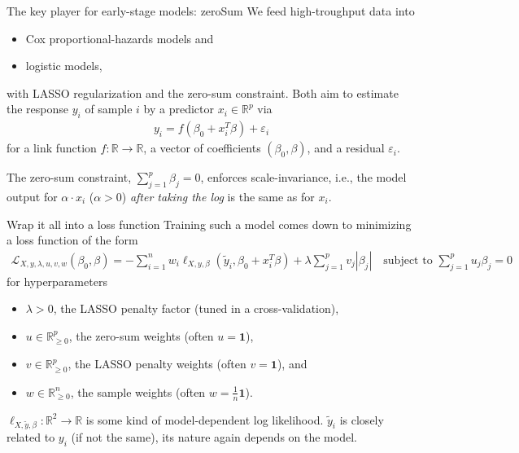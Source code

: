 \documentclass[10pt, aspectratio=169]{beamer}
\def\RR{\mathbb{R}}
\begin{document}
\begin{frame}{The key player for early-stage models: zeroSum}
  We feed high-troughput data into 

  \begin{itemize}
    \item \alert{Cox} proportional-hazards models and
    \item \alert{logistic} models,
  \end{itemize}

  with \alert{LASSO} regularization and the \alert{zero-sum} constraint. Both  
  aim to estimate the response $y_i$ of sample $i$ by a predictor $x_i \in \mathbb{R}^p$ via 
  \begin{align}
    y_i = f(\beta_0 + x_i^T \beta) + \varepsilon_i
  \end{align}
  for a link function $f: \mathbb{R} \to \mathbb{R}$, a vector of coefficients $(\beta_0, 
  \beta)$, and a residual $\varepsilon_i$.

  \pause
  The zero-sum constraint, $\sum_{j=1}^p \beta_j = 0$, enforces \alert{scale-invariance}, i.e., 
  the model output for $\alpha \cdot x_i$ ($\alpha > 0$) \textit{after taking the log} is the same 
  as for $x_i$.
\end{frame}

\begin{frame}{Wrap it all into a loss function}
  Training such a model comes down to minimizing a loss function of the form 
  \begin{align}
    \mathcal{L}_{X, y, \lambda, u, v, w}(\beta_0, \beta) = -\sum_{i=1}^n w_i 
    \ell_{X, y, \beta}(\tilde{y}_i, \beta_0 + x_i^T \beta) + \lambda \sum_{j=1}^p v_j |\beta_j| 
    \quad \text{subject to } \sum_{j=1}^p u_j \beta_j = 0
  \end{align}
  for hyperparameters 
  \begin{itemize}
    \item $\lambda > 0$, the LASSO penalty factor (tuned in a cross-validation),
    \item $u \in \RR^p_{\geq 0}$, the zero-sum weights (often $u = \mathbf{1}$),
    \item $v \in \RR^p_{\geq 0}$, the LASSO penalty weights (often $v = \mathbf{1}$), and
    \item $w \in \RR^n_{\geq 0}$, the sample weights (often $w = \frac{1}{n} \mathbf{1}$).
  \end{itemize}

  $\ell_{X, \tilde{y}, \beta}: \RR^2 \to \RR$ is some kind of model-dependent log likelihood. $\tilde{y}_i$ 
  is closely related to $y_i$ (if not the same), its nature again depends on the model.
\end{frame}
\end{document}
